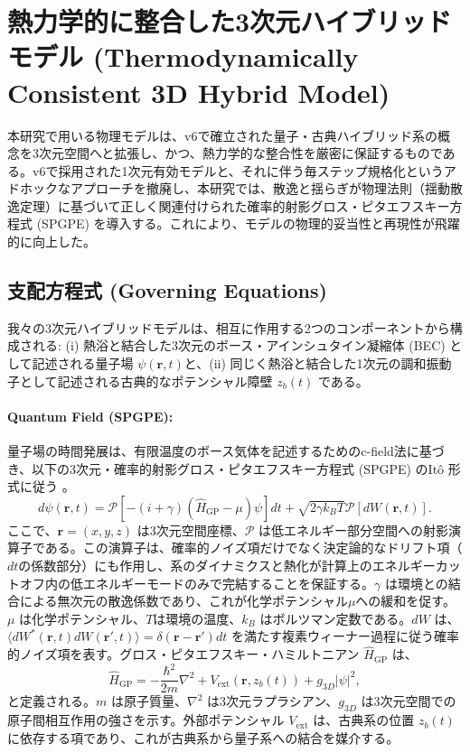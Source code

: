 \documentclass[a4paper,11pt,ja=standard,lualatex]{bxjsarticle}
\begin{document}
\section{熱力学的に整合した3次元ハイブリッドモデル (Thermodynamically Consistent 3D Hybrid Model)}
\label{sec:methods}
本研究で用いる物理モデルは、v6で確立された量子・古典ハイブリッド系の概念を3次元空間へと拡張し、かつ、熱力学的な整合性を厳密に保証するものである。v6で採用された1次元有効モデルと、それに伴う毎ステップ規格化というアドホックなアプローチを撤廃し、本研究では、散逸と揺らぎが物理法則（揺動散逸定理）に基づいて正しく関連付けられた確率的射影グロス・ピタエフスキー方程式 (SPGPE) を導入する。これにより、モデルの物理的妥当性と再現性が飛躍的に向上した。

\subsection{支配方程式 (Governing Equations)}
\label{subsec:equations}
我々の3次元ハイブリッドモデルは、相互に作用する2つのコンポーネントから構成される: (i) 熱浴と結合した3次元のボース・アインシュタイン凝縮体 (BEC) として記述される量子場 $\psi(\mathbf{r}, t)$と、(ii) 同じく熱浴と結合した1次元の調和振動子として記述される古典的なポテンシャル障壁 $z_b(t)$ である。

\paragraph{Quantum Field (SPGPE):}
量子場の時間発展は、有限温度のボース気体を記述するためのc-field法に基づき、以下の3次元・確率的射影グロス・ピタエフスキー方程式 (SPGPE) のItô 形式に従う \cite{Blakie2008}。
\begin{equation}
    d\psi(\mathbf{r},t) = \mathcal{P}\left[ - (i+\gamma)(\hat{H}_{\mathrm{GP}} - \mu)\psi \right]dt + \sqrt{2\gamma k_B T}\mathcal{P}[dW(\mathbf{r},t)].
    \label{eq:spgpe}
\end{equation}
ここで、$\mathbf{r}=(x,y,z)$ は3次元空間座標、$\mathcal{P}$ は低エネルギー部分空間への射影演算子である。この演算子は、確率的ノイズ項だけでなく決定論的なドリフト項（$dt$の係数部分）にも作用し、系のダイナミクスと熱化が計算上のエネルギーカットオフ内の低エネルギーモードのみで完結することを保証する。$\gamma$ は環境との結合による無次元の散逸係数であり、これが化学ポテンシャル$\mu$への緩和を促す。$\mu$ は化学ポテンシャル、$T$は環境の温度、$k_B$ はボルツマン定数である。$dW$ は、$\langle dW^*(\mathbf{r},t)dW(\mathbf{r}',t) \rangle = \delta(\mathbf{r} - \mathbf{r}')dt$ を満たす複素ウィーナー過程に従う確率的ノイズ項を表す。グロス・ピタエフスキー・ハミルトニアン $\hat{H}_{\mathrm{GP}}$ は、
\begin{equation}
    \hat{H}_{\mathrm{GP}} = -\frac{\hbar^2}{2m}\nabla^2 + V_{\mathrm{ext}}(\mathbf{r}, z_b(t)) + g_{3D}|\psi|^2,
\end{equation}
と定義される。$m$ は原子質量、$\nabla^2$ は3次元ラプラシアン、$g_{3D}$ は3次元空間での原子間相互作用の強さを示す。外部ポテンシャル $V_{\mathrm{ext}}$ は、古典系の位置 $z_b(t)$ に依存する項であり、これが古典系から量子系への結合を媒介する。
\end{document}
